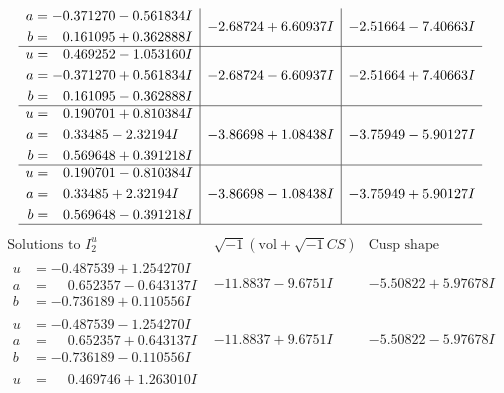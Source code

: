 \documentclass[1p]{elsarticle_modified}
\theoremstyle{definition}
\newcommand{\I}{\sqrt{-1}}
\begin{document}
$$\begin{array}{c|c|c}
\begin{aligned}
a &= -0.371270 - 0.561834 I \\
b &= \phantom{-}0.161095 + 0.362888 I\end{aligned}
 & -2.68724 + 6.60937 I & -2.51664 - 7.40663 I \\ \hline\begin{aligned}
u &= \phantom{-}0.469252 - 1.053160 I \\
a &= -0.371270 + 0.561834 I \\
b &= \phantom{-}0.161095 - 0.362888 I\end{aligned}
 & -2.68724 - 6.60937 I & -2.51664 + 7.40663 I \\ \hline\begin{aligned}
u &= \phantom{-}0.190701 + 0.810384 I \\
a &= \phantom{-}0.33485 - 2.32194 I \\
b &= \phantom{-}0.569648 + 0.391218 I\end{aligned}
 & -3.86698 + 1.08438 I & -3.75949 - 5.90127 I \\ \hline\begin{aligned}
u &= \phantom{-}0.190701 - 0.810384 I \\
a &= \phantom{-}0.33485 + 2.32194 I \\
b &= \phantom{-}0.569648 - 0.391218 I\end{aligned}
 & -3.86698 - 1.08438 I & -3.75949 + 5.90127 I\\
 \hline 
 \end{array}$$\newpage$$\begin{array}{c|c|c}  
\text{Solutions to }I^u_{2}& \I (\text{vol} + \sqrt{-1}CS) & \text{Cusp shape}\\
 \hline 
\begin{aligned}
u &= -0.487539 + 1.254270 I \\
a &= \phantom{-}0.652357 - 0.643137 I \\
b &= -0.736189 + 0.110556 I\end{aligned}
 & -11.8837 - 9.6751 I & -5.50822 + 5.97678 I \\ \hline\begin{aligned}
u &= -0.487539 - 1.254270 I \\
a &= \phantom{-}0.652357 + 0.643137 I \\
b &= -0.736189 - 0.110556 I\end{aligned}
 & -11.8837 + 9.6751 I & -5.50822 - 5.97678 I \\ \hline\begin{aligned}
u &= \phantom{-}0.469746 + 1.263010 I \\

\end{aligned}
\end{array}$$
\end{document}

